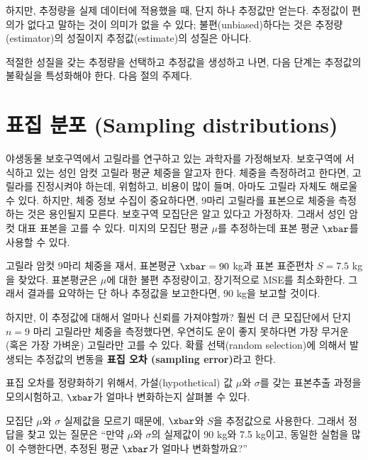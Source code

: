 
하지만, 추정량을 실제 데이터에 적용했을 때,
단지 하나 추정값만 얻는다. 추정값이 편의가 없다고 말하는 것이 의미가 없을 수 있다; 불편(unbiased)하다는 것은 추정량(estimator)의 성질이지 추정값(estimate)의 성질은 아니다.

적절한 성질을 갖는 추정량을 선택하고 추정값을 생성하고 나면, 다음 단계는 추정값의 불확실을 특성화해야 한다. 다음 절의 주제다.


\section{표집 분포 (Sampling distributions)}
\label{gorilla}

야생동물 보호구역에서 고릴라를 연구하고 있는 과학자를 가정해보자.
보호구역에 서식하고 있는 성인 암컷 고릴라 평균 체중을 알고자 한다.
체중을 측정하려고 한다면, 고릴라를 진정시켜야 하는데, 위험하고, 비용이 많이 들며, 아마도 고릴라 자체도 해로울 수 있다.
하지만, 체중 정보 수집이 중요하다면, 9마리 고릴라를 표본으로 체중을 측정하는 것은 용인될지 모른다.
보호구역 모집단은 알고 있다고 가정하자. 그래서 성인 암컷 대표 표본을 고를 수 있다. 미지의 모집단 평균 $\mu$를 추정하는데 표본 평균 $\xbar$를 사용할 수 있다.

고릴라 암컷 9마리 체중을 재서, 표본평균 $\xbar=90$ kg과 표본 표준편차 $S=7.5$ kg을 찾았다. 
표본평균은 $\mu$에 대한 불편 추정량이고, 장기적으로 MSE를 최소화한다. 그래서 결과를 요약하는 단 하나 추정값을 보고한다면, 90 kg을 보고할 것이다.

하지만, 이 추정값에 대해서 얼마나 신뢰를 가져야할까?
훨씬 더 큰 모집단에서 단지 $n=9$ 마리 고릴라만 체중을 측정했다면, 우연히도 운이 좋지 못하다면 가장 무거운 (혹은 가장 가벼운) 고릴라만 고를 수 있다.
확률 선택(random selection)에 의해서 발생되는 추정값의 변동을 {\bf 표집 오차 (sampling error)}라고 한다.

표집 오차를 정량화하기 위해서, 가설(hypothetical) 값 $\mu$와 $\sigma$를 갖는 표본추출 과정을 모의시험하고, $\xbar$가 얼마나 변화하는지 살펴볼 수 있다.

모집단 $\mu$와 $\sigma$ 실제값을 모르기 때문에, 
$\xbar$와 $S$을 추정값으로 사용한다. 
그래서 정답을 찾고 있는 질문은
``만약 $\mu$와 $\sigma$의 실제값이 90 kg와 7.5 kg이고,
동일한 실험을 많이 수행한다면, 추정된 평균 $\xbar$가 얼마나 변화할까요?''

